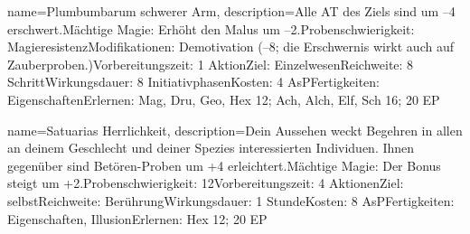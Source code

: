 {
    name={Plumbumbarum schwerer Arm},
    description={Alle AT des Ziels sind um –4 erschwert.\newline Mächtige Magie: Erhöht den Malus um –2.\newline Probenschwierigkeit: Magieresistenz\newline Modifikationen: Demotivation (–8; die Erschwernis wirkt auch auf Zauberproben.)\newline Vorbereitungszeit: 1 Aktion\newline Ziel: Einzelwesen\newline Reichweite: 8 Schritt\newline Wirkungsdauer: 8 Initiativphasen\newline Kosten: 4 AsP\newline Fertigkeiten: Eigenschaften\newline Erlernen: Mag, Dru, Geo, Hex 12; Ach, Alch, Elf, Sch 16; 20 EP}
}


{
    name={Satuarias Herrlichkeit},
    description={Dein Aussehen weckt Begehren in allen an deinem Geschlecht und deiner Spezies interessierten Individuen. Ihnen gegenüber sind Betören-Proben um +4 erleichtert.\newline Mächtige Magie: Der Bonus steigt um +2.\newline Probenschwierigkeit: 12\newline Vorbereitungszeit: 4 Aktionen\newline Ziel: selbst\newline Reichweite: Berührung\newline Wirkungsdauer: 1 Stunde\newline Kosten: 8 AsP\newline Fertigkeiten: Eigenschaften, Illusion\newline Erlernen: Hex 12; 20 EP}
}


